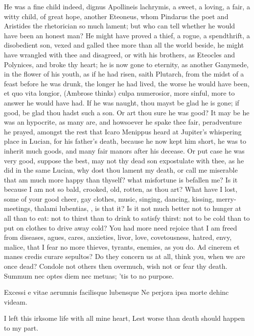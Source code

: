{He was a fine child indeed, dignus Apollineis lachrymis, a sweet, a
loving, a fair, a witty child, of great hope, another Eteoneus, whom
Pindarus the poet and Aristides the rhetorician so much lament; but who
can tell whether he would have been an honest man? He might have proved
a thief, a rogue, a spendthrift, a disobedient son, vexed and galled
thee more than all the world beside, he might have wrangled with thee
and disagreed, or with his brothers, as Eteocles and Polynices, and
broke thy heart; he is now gone to eternity, as another Ganymede, in
the flower of his youth, as if he had risen, saith
Plutarch, from the midst of a feast before he was drunk, the
longer he had lived, the worse he would have been, et quo vita longior,
(Ambrose thinks) culpa numerosior, more sinful, more to answer he would
have had. If he was naught, thou mayst be glad he is gone; if good, be
glad thou hadst such a son. Or art thou sure he was good? It may be he
was an hypocrite, as many are, and howsoever he spake thee fair,
peradventure he prayed, amongst the rest that Icaro Menippus heard at
Jupiter's whispering place in Lucian, for his father's death, because
he now kept him short, he was to inherit much goods, and many fair
manors after his decease. Or put case he was very good, suppose the
best, may not thy dead son expostulate with thee, as he did in the same
Lucian, why dost thou lament my death, or call me miserable that
am much more happy than thyself? what misfortune is befallen me? Is it
because I am not so bald, crooked, old, rotten, as thou art? What have
I lost, some of your good cheer, gay clothes, music, singing, dancing,
kissing, merry-meetings, thalami lubentias, \etc{}, is that it? Is it not
much better not to hunger at all than to eat: not to thirst than to
drink to satisfy thirst: not to be cold than to put on clothes to drive
away cold? You had more need rejoice that I am freed from diseases,
agues, cares, anxieties, livor, love, covetousness, hatred, envy,
malice, that I fear no more thieves, tyrants, enemies, as you do.
Ad cinerem et manes credis curare sepultos? Do they concern us at
all, think you, when we are once dead? Condole not others then
overmuch, wish not or fear thy death.  Summum nec optes diem nec
metuas; 'tis to no purpose.

Excessi e vitae aerumnis facilisque lubensque
Ne perjora ipsa morte dehinc videam.

I left this irksome life with all mine heart,
Lest worse than death should happen to my part.

}
